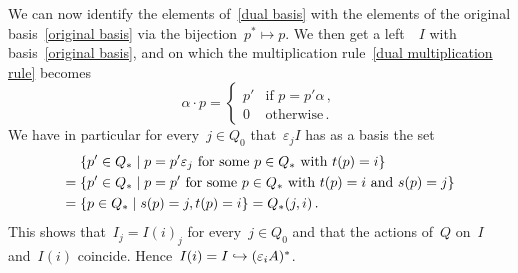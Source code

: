\begin{remark*}
\begin{enumerate}
      We can now identify the elements of~\eqref{dual basis} with the elements of the original basis~\eqref{original basis} via the bijection~$p^* \mapsto p$.
      We then get a left~{}~$I$ with basis~\eqref{original basis}, and on which the multiplication rule~\eqref{dual multiplication rule} becomes
      \[
        \alpha \cdot p
        =
        \begin{cases}
          p'  & \text{if~$p = p' \alpha$} \,, \\
          0   & \text{otherwise}  \,.
        \end{cases}
      \]
      We have in particular for every~$j \in Q_0$ that~$\varepsilon_j I$ has as a basis the set
      \begin{align*}
        {}&
        \{
          p' \in Q_*
        \suchthat
          \text{$p = p' \varepsilon_j$ for some~$p \in Q_*$ with~$t(p) = i$}
        \}
        \\
        ={}&
        \{
          p' \in Q_*
        \suchthat
          \text{$p = p'$ for some~$p \in Q_*$ with~$t(p) = i$ and~$s(p) = j$}
        \}
        \\
        ={}&
        \{
          p \in Q_*
        \suchthat
          s(p) = j,
          t(p) = i
        \}
        =
        Q_*(j,i)  \,.
      \end{align*}
      This shows that~$I_j = I(i)_j$ for every~$j \in Q_0$ and that the actions of~$Q$ on~$I$ and~$I(i)$ coincide.
      Hence~$I(i) = I \hookrightarrow (\varepsilon_i A)^*$.
  \end{enumerate}
\end{remark*}




